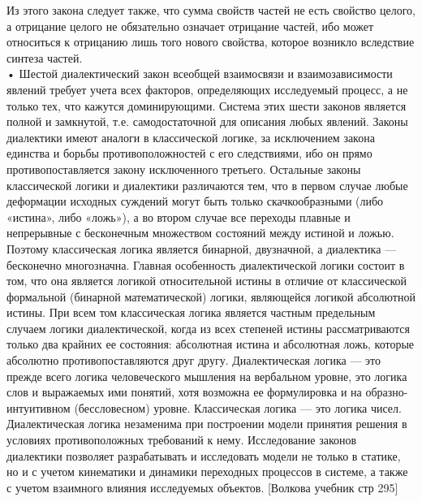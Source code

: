 \documentclass[a4paper,12pt]{report}
\begin{document}
Из этого закона следует также, что сумма свойств частей не есть свойство целого, а отрицание целого не обязательно означает отрицание частей, ибо может относиться к отрицанию лишь того нового свойства, которое возникло вследствие синтеза частей.\\
    • Шестой диалектический закон всеобщей взаимосвязи и взаимозависимости явлений требует учета всех факторов, определяющих исследуемый процесс, а не только тех, что кажутся доминирующими.
Система этих шести законов является полной и замкнутой, т.е. самодостаточной для описания любых явлений. Законы диалектики имеют аналоги в классической логике, за исключением закона единства и борьбы противоположностей с его следствиями, ибо он прямо противопоставляется закону исключенного третьего. Остальные законы классической логики и диалектики различаются тем, что в первом случае любые деформации исходных суждений могут быть только скачкообразными (либо «истина», либо «ложь»), а во втором случае все переходы плавные и непрерывные с бесконечным множеством состояний между истиной и ложью. Поэтому классическая логика является бинарной, двузначной, а диалектика — бесконечно многозначна. Главная особенность диалектической логики состоит в том, что она является логикой относительной истины в отличие от классической формальной (бинарной математической) логики, являющейся логикой абсолютной истины. При всем том классическая логика является частным предельным случаем логики диалектической, когда из всех степеней истины рассматриваются только два крайних ее состояния: абсолютная истина и абсолютная ложь, которые абсолютно противопоставляются друг другу.
	Диалектическая логика — это прежде всего логика человеческого мышления на вербальном уровне, это логика слов и выражаемых ими понятий, хотя возможна ее формулировка и на образно-интуитивном (бессловесном) уровне. Классическая логика — это логика чисел.\\[Денисов]
	
	Диалектическая логика незаменима при построении модели принятия решения в условиях противоположных требований к нему.
	Исследование законов диалектики позволяет разрабатывать и исследовать модели не только в статике, но и с учетом кинематики и динамики переходных процессов в системе, а также с учетом взаимного влияния исследуемых объектов. [Волкова учебник стр 295]
	
\end{document}
